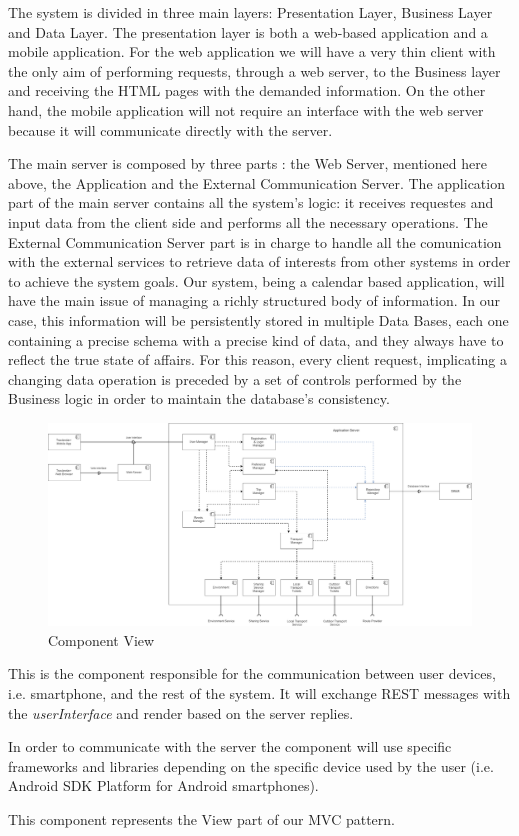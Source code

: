 The system is divided in three main layers: Presentation Layer, Business Layer and Data Layer.
The presentation layer is both a web-based application and a mobile application. For the web application we will have a very thin client with the only aim of performing requests, through a web server, to the Business layer and receiving the HTML pages with the demanded information.
On the other hand, the mobile application will not require an interface with the web server because it will communicate directly with the server.

The main server is composed by three parts : the Web Server, mentioned here above, the Application and the External Communication Server. The application part of the main server contains all the system's logic: it receives requestes and input data from the client side and performs all the necessary operations.
The External Communication Server part is in charge to handle all the comunication with the external services to retrieve data of interests from other systems in order to achieve the system goals.
Our system, being a calendar based application, will have the main issue of managing a richly structured body of information. In our case, this information will be persistently stored in multiple Data Bases, each one containing a precise schema with a precise kind of data, and they always have to reflect the true state of affairs. For this reason, every client request, implicating a changing data operation is preceded by a set of controls performed by the Business logic in order to maintain the database’s consistency.

\begin{figure}[H]
	\centering
	\includegraphics[scale=0.17]{Images/Architecture/Components_View}
	\caption{Component View}
\end{figure}
This is the component responsible for the communication between user devices, i.e. smartphone, and the rest of the system. It will exchange REST messages with the \emph{userInterface} and render based on the server replies.\par
In order to communicate with the server the component will use specific frameworks and libraries depending on the specific device used by the user (i.e. Android SDK Platform for Android smartphones).\par
This component represents the View part of our MVC pattern.

